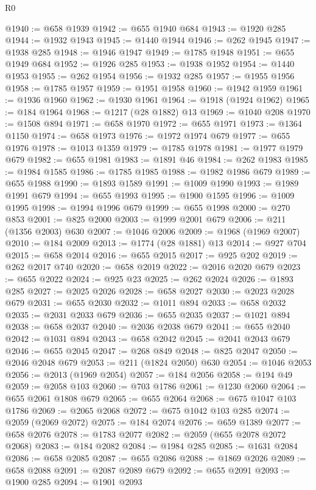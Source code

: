 \begin{lexlean}{R0}
\begin{coremodule}
@1940 := @658 @1939
@1942 := @655 @1940 @684
@1943 := @1920 @285
@1944 := @1932 @1943
@1945 := @1440 @1944
@1946 := @262 @1945
@1947 := @1938 @285
@1948 := @1946 @1947
@1949 := @1785 @1948
@1951 := @655 @1949 @684
@1952 := @1926 @285
@1953 := @1938 @1952
@1954 := @1440 @1953
@1955 := @262 @1954
@1956 := @1932 @285
@1957 := @1955 @1956
@1958 := @1785 @1957
@1959 := @1951 @1958
@1960 := @1942 @1959
@1961 := @1936 @1960
@1962 := @1930 @1961
@1964 := @1918 (@1924 @1962)
@1965 := @184 @1964
@1968 := @1217 (@28 @1882) @13
@1969 := @1040 @208
@1970 := @1508 @894
@1971 := @658 @1970
@1972 := @655 @1971
@1973 := @1364 @1150
@1974 := @658 @1973
@1976 := @1972 @1974 @679
@1977 := @655 @1976
@1978 := @1013 @1359
@1979 := @1785 @1978
@1981 := @1977 @1979 @679
@1982 := @655 @1981
@1983 := @1891 @46
@1984 := @262 @1983
@1985 := @1984 @1585
@1986 := @1785 @1985
@1988 := @1982 @1986 @679
@1989 := @655 @1988
@1990 := @1893 @1589
@1991 := @1009 @1990
@1993 := @1989 @1991 @679
@1994 := @655 @1993
@1995 := @1900 @1595
@1996 := @1009 @1995
@1998 := @1994 @1996 @679
@1999 := @655 @1998
@2000 := @270 @853
@2001 := @825 @2000
@2003 := @1999 @2001 @679
@2006 := @211 (@1356 @2003) @630
@2007 := @1046 @2006
@2009 := @1968 (@1969 @2007)
@2010 := @184 @2009
@2013 := @1774 (@28 @1881) @13
@2014 := @927 @704
@2015 := @658 @2014
@2016 := @655 @2015
@2017 := @925 @202
@2019 := @262 @2017 @740
@2020 := @658 @2019
@2022 := @2016 @2020 @679
@2023 := @655 @2022
@2024 := @925 @23
@2025 := @262 @2024
@2026 := @1893 @285
@2027 := @2025 @2026
@2028 := @658 @2027
@2030 := @2023 @2028 @679
@2031 := @655 @2030
@2032 := @1011 @894
@2033 := @658 @2032
@2035 := @2031 @2033 @679
@2036 := @655 @2035
@2037 := @1021 @894
@2038 := @658 @2037
@2040 := @2036 @2038 @679
@2041 := @655 @2040
@2042 := @1031 @894
@2043 := @658 @2042
@2045 := @2041 @2043 @679
@2046 := @655 @2045
@2047 := @268 @849
@2048 := @825 @2047
@2050 := @2046 @2048 @679
@2053 := @211 (@1824 @2050) @630
@2054 := @1046 @2053
@2056 := @2013 (@1969 @2054)
@2057 := @184 @2056
@2058 := @194 @49
@2059 := @2058 @103
@2060 := @703 @1786
@2061 := @1230 @2060
@2064 := @655 @2061 @1808 @679
@2065 := @655 @2064
@2068 := @675 @1047 @103 @1786
@2069 := @2065 @2068
@2072 := @675 @1042 @103 @285
@2074 := @2059 (@2069 @2072)
@2075 := @184 @2074
@2076 := @659 @1389
@2077 := @658 @2076
@2078 := @1783 @2077
@2082 := @2059 (@655 @2078 @2072 @2068)
@2083 := @184 @2082
@2084 := @1984 @285
@2085 := @1631 @2084
@2086 := @658 @2085
@2087 := @655 @2086
@2088 := @1869 @2026
@2089 := @658 @2088
@2091 := @2087 @2089 @679
@2092 := @655 @2091
@2093 := @1900 @285
@2094 := @1901 @2093

\end{coremodule}
\end{lexlean}
